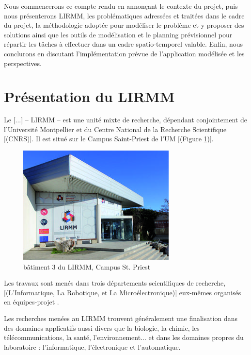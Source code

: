 \documentclass[a4paper,12pt]{book}
\theoremstyle{break}
\theoremstyle{break}
\theoremstyle{break}
\theoremstyle{break}
\theoremstyle{definition}
\theoremstyle{remark}
\begin{document}
Nous commencerons ce compte rendu en annonçant le contexte du projet, puis nous présenterons LIRMM, les problématiques adressées et traitées dans le cadre du projet, la méthodologie adoptée pour modéliser le problème et y proposer des solutions ainsi que les outils de modélisation et le planning prévisionnel pour répartir les tâches à effectuer dans un cadre spatio-temporel valable. Enfin, nous conclurons en discutant l'implémentation prévue de l'application modélisée et les perspectives.

\section{Présentation du LIRMM}
\og Le [...] – LIRMM – est une unité mixte de recherche, dépendant conjointement de l'Université Montpellier et du Centre National de la Recherche Scientifique [(CNRS)]. Il est situé sur le Campus Saint-Priest de l'UM [(Figure \ref{fig:lirmmPhoto})].

\begin{figure}[!ht]
  \centering
  \includegraphics[scale=0.9]{images/lirmmPhoto.jpg}
  \caption{bâtiment 3 du LIRMM, Campus St. Priest}
  \label{fig:lirmmPhoto}
\end{figure}

Les travaux sont menés dans trois départements scientifiques de recherche, [(L’Informatique, La Robotique, et La Microélectronique)] eux-mêmes organisés en \og équipes-projet \fg.

Les recherches menées au LIRMM trouvent généralement une finalisation dans des domaines applicatifs aussi divers que la biologie, la chimie, les télécommunications, la santé, l'environnement... et dans les domaines propres du laboratoire : l'informatique, l'électronique et l'automatique.
\end{document}
